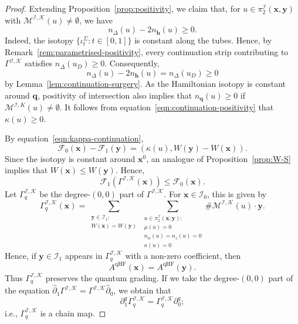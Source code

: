 \documentclass[11pt]{amsart}
\numberwithin{equation}{section}
\numberwithin{figure}{section}
\theoremstyle{definition}
\newcommand{\cF}{\mathcal{F}}
\newcommand{\cI}{\mathcal{I}}
\newcommand{\cK}{\mathscr{K}}
\newcommand{\cM}{\mathcal{M}}
\newcommand{\ph}{\widehat{\partial}}
\newcommand{\sI}{\mathscr{I}}
\DeclareMathOperator{\qHF}{qHF}
\newcommand{\hs}{\boldsymbol{h}}
\newcommand{\qs}{\boldsymbol{q}}
\newcommand{\xs}{\boldsymbol{x}}
\newcommand{\ys}{\boldsymbol{y}}
\begin{document}
\begin{proof}
    Extending Proposition~\ref{prop:positivity}, we claim that, for $u \in \pi_2^\sI(\xs,\ys)$ with $\cM^{\sI, \cK}(u) \neq \emptyset$, we have
    \begin{equation}\label{eqn:continuation-positivity}
    n_\Delta(u) - 2n_{\hs}(u) \ge 0.
    \end{equation}
    Indeed, the isotopy $\{\iota^\Sigma_t : t \in [0,1]\}$ is constant along the tubes. Hence, by Remark~\ref{rem:parametrised-positivity}, every continuation strip contributing to $\Gamma^{\sI, \cK}$ satisfies $n_\Delta(u_D) \ge 0$. Consequently,
    \[
    n_\Delta(u) - 2n_{\hs}(u) = n_\Delta(u_D) \ge 0
    \]
    by Lemma~\ref{lem:continuation-surgery}. As the Hamiltonian isotopy is constant around $\qs$, positivity of intersection also implies that $n_{\qs}(u) \ge 0$ if $\cM^{\sI, K}(u) \neq \emptyset$. It follows from equation~\eqref{eqn:continuation-positivity} that $\kappa(u) \ge 0$.

    By equation~\eqref{eqn:kappa-continuation},
    \[
    \cF_0(\xs) - \cF_1(\ys) = (\kappa(u), W(\ys) - W(\xs)).
    \]
    Since the isotopy is constant around $\xs^0$, an analogue of Proposition~\ref{prop:W-S} implies that $W(\xs) \le W(\ys)$. Hence,
    \[
    \cF_1\left(\Gamma^{\sI, \cK}(\xs)\right) \le \cF_0(\xs).
    \]
    Let $\Gamma^{\sI, \cK}_q$ be the degree-$(0,0)$ part of $\Gamma^{\sI, \cK}$. For $\xs \in \cI_0$, this is given by
    \[
    \Gamma^{\sI, \cK}_q(\xs) = \sum_{\substack{\ys \in \cI_1: \\ W(\xs) = W(\ys)}} \sum_{\substack{u \in \pi_2^{\sI}(\xs,\ys):\\ \mu(u)=0 \\ n_w(u) = n_z(u) = 0 \\ \kappa(u) = 0}} \#\cM^{\sI, \cK}(u) \cdot \ys.
    \]
    Hence, if $\ys \in \cI_1$ appears in $\Gamma^{\sI, \cK}_q$ with a non-zero coefficient, then
    \[
    A^{\qHF}(\xs) = A^{\qHF}(\ys).
    \]
    Thus $\Gamma^{\sI, \cK}_q$ preserves the quantum grading. If we take the degree-$(0,0)$ part of the equation $\ph_1 \Gamma^{\sI, \cK} = \Gamma^{\sI, \cK} \ph_0$, we obtain that 
    \[
    \partial^q_1 \Gamma_q^{\sI, \cK} = \Gamma_q^{\sI, \cK} \partial^q_0;
    \]
    i.e., $\Gamma^{\sI, \cK}_q$ is a chain map.


\end{proof}
\end{document}
